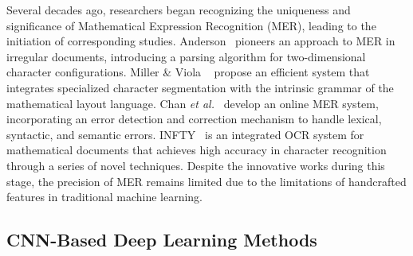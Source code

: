 \documentclass[runningheads]{llncs}
\begin{document}
Several decades ago, researchers began recognizing the uniqueness and significance of Mathematical Expression Recognition (MER), leading to the initiation of corresponding studies. Anderson~\cite{anderson1967syntax} pioneers an approach to MER in irregular documents, introducing a parsing algorithm for two-dimensional character configurations. Miller \& Viola ~\cite{Miller_Viola_1998} propose an efficient system that integrates specialized character segmentation with the intrinsic grammar of the mathematical layout language. Chan \textit{et al.}~\cite{Chan_Yeung_1999} develop an online MER system, incorporating an error detection and correction mechanism to handle lexical, syntactic, and semantic errors. INFTY~\cite{suzuki2003infty} is an integrated OCR system for mathematical documents that achieves high accuracy in character recognition through a series of novel techniques. Despite the innovative works during this stage, the precision of MER remains limited due to the limitations of handcrafted features in traditional machine learning.


\subsection{CNN-Based Deep Learning Methods}
\end{document}
